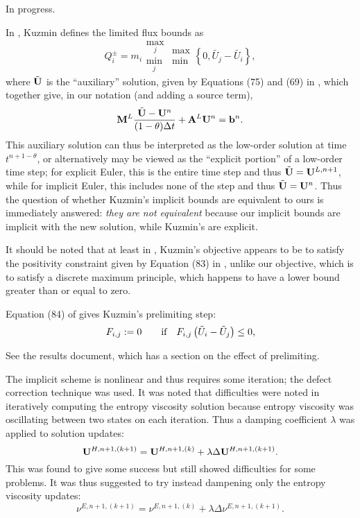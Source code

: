 \begin{enumerate}
In progress.

In \cite{kuzmin_FCT}, Kuzmin defines the limited flux bounds as
\[
  Q_i^\pm=m_i\substack{\max_j\\\min_j}\substack{\max\\\min}
    \left\{0,\tilde{U_j}-\tilde{U_i}\right\},
\]
where $\tilde{\mathbf{U}}$ is the ``auxiliary'' solution, given by Equations (75) and (69)
in \cite{kuzmin_FCT}, which together give, in our notation (and adding a source term),
\[
  \mathbf{M}^L\frac{\tilde{\mathbf{U}}-\mathbf{U}^n}{(1-\theta)\Delta t} + \mathbf{A}^L\mathbf{U}^n = \mathbf{b}^n.
\]
This auxiliary solution can thus be interpreted as the low-order solution at time
$t^{n+1-\theta}$, or alternatively may be viewed as the ``explicit portion'' of
a low-order time step; for explicit Euler, this is the entire time step and thus
$\tilde{\mathbf{U}}=\mathbf{U}^{L,n+1}$, while for implicit Euler, this includes none of the step
and thus $\tilde{\mathbf{U}}=\mathbf{U}^{n}$. Thus the question of whether Kuzmin's implicit bounds are
equivalent to ours is immediately answered: \emph{they are not equivalent} because
our implicit bounds are implicit with the new solution, while Kuzmin's are
explicit.

It should be noted that at least in \cite{kuzmin_FCT}, Kuzmin's objective
appears to be to satisfy the positivity constraint given by Equation (83)
in \cite{kuzmin_FCT}, unlike our objective, which is to satisfy a discrete
maximum principle, which happens to have a lower bound greater than or
equal to zero.

Equation (84) of \cite{kuzmin_FCT} gives Kuzmin's prelimiting step:
\[
  F_{i,j} := 0 \qquad \mbox{if}\quad F_{i,j} \left(\tilde{U}_i-\tilde{U}_j\right)\leq 0,
\]

See the results document, which has a section on the effect of prelimiting.

The implicit scheme is nonlinear and thus requires some iteration; the defect
correction technique was used. It was noted that difficulties were noted in
iteratively computing the entropy viscosity solution because entropy viscosity
was oscillating between two states on each iteration. Thus a damping coefficient
$\lambda$ was applied to solution updates:
\[
  \mathbf{U}^{H,n+1,(k+1)} = \mathbf{U}^{H,n+1,(k)} + \lambda\Delta\mathbf{U}^{H,n+1,(k+1)}.
\]
This was found to give some success but still showed difficulties for some
problems. It was thus suggested to try instead dampening only the entropy viscosity updates:
\[
  \nu^{E,n+1,(k+1)} = \nu^{E,n+1,(k)} + \lambda\Delta\nu^{E,n+1,(k+1)}.
\]
\end{enumerate}
